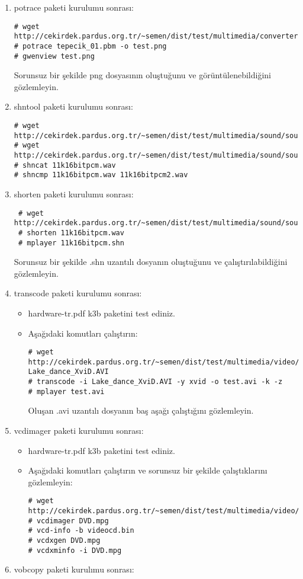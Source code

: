 \documentclass[a4paper,10pt]{article}
\begin{document}
\begin{enumerate}
\item potrace paketi kurulumu sonrası:
\begin{verbatim}
# wget http://cekirdek.pardus.org.tr/~semen/dist/test/multimedia/converter/tepecik_01.pbm 
# potrace tepecik_01.pbm -o test.png
# gwenview test.png
\end{verbatim}

Sorunsuz bir şekilde png dosyasının oluştuğunu ve görüntülenebildiğini gözlemleyin.

\item shntool paketi kurulumu sonrası:
\begin{verbatim}
# wget http://cekirdek.pardus.org.tr/~semen/dist/test/multimedia/sound/sound/sample.wav
# wget http://cekirdek.pardus.org.tr/~semen/dist/test/multimedia/sound/sound/11k16bitpcm2.wav
# shncat 11k16bitpcm.wav
# shncmp 11k16bitpcm.wav 11k16bitpcm2.wav
\end{verbatim}
\item shorten paketi kurulumu sonrası:
\begin{verbatim}
 # wget http://cekirdek.pardus.org.tr/~semen/dist/test/multimedia/sound/sound/sample.wav
 # shorten 11k16bitpcm.wav
 # mplayer 11k16bitpcm.shn
\end{verbatim}

Sorunsuz bir şekilde .shn uzantılı dosyanın oluştuğunu ve çalıştırılabildiğini  gözlemleyin.
\item transcode paketi kurulumu sonrası:

\begin{itemize}
 \item hardware-tr.pdf k3b paketini test ediniz.
 \item Aşağıdaki komutları çalıştırın:
\begin{verbatim}
# wget http://cekirdek.pardus.org.tr/~semen/dist/test/multimedia/video/cokluortam/
Lake_dance_XviD.AVI
# transcode -i Lake_dance_XviD.AVI -y xvid -o test.avi -k -z
# mplayer test.avi
\end{verbatim}
 Oluşan .avi uzantılı dosyanın baş aşağı çalıştığını gözlemleyin.
\end{itemize}

\item vcdimager paketi kurulumu sonrası:

\begin{itemize}
 \item hardware-tr.pdf k3b paketini test ediniz.
 \item Aşağıdaki komutları çalıştırın ve sorunsuz bir şekilde çalıştıklarını gözlemleyin:
\begin{verbatim}
# wget http://cekirdek.pardus.org.tr/~semen/dist/test/multimedia/video/cokluortam/DVD.mpg
# vcdimager DVD.mpg
# vcd-info -b videocd.bin
# vcdxgen DVD.mpg
# vcdxminfo -i DVD.mpg
\end{verbatim}

\end{itemize}
\item vobcopy paketi kurulımu sonrası:

\end{enumerate}
\end{document}

